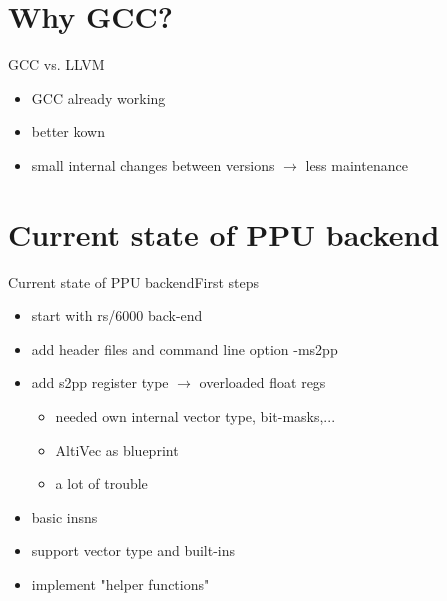\documentclass[10pt]{beamer}
\begin{document}
\section{Why GCC?}
\begin{frame}{GCC vs. LLVM}
	\begin{itemize}
		\item GCC already working
		\item better kown
		\item small internal changes between versions $\rightarrow$ less maintenance
	\end{itemize}
\end{frame}

\section{Current state of PPU backend}
\begin{frame}{Current state of PPU backend}{First steps}
	\begin{itemize}
		\item start with rs/6000 back-end
		\item add header files and command line option -ms2pp
		\item add s2pp register type $\rightarrow$ overloaded float regs
			\begin{itemize}
				\item needed own internal vector type, bit-masks,...
				\item AltiVec as blueprint
				\item a lot of trouble
			\end{itemize}
		\item basic insns
		\item support vector type and built-ins
		\item implement "helper functions"
	\end{itemize}
\end{frame}
\end{document}
